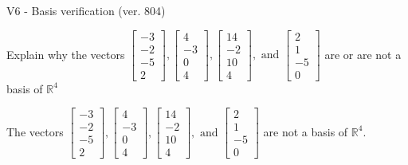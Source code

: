 \begin{exercise}
  \begin{exerciseTitle}V6 - Basis verification (ver. 804)\end{exerciseTitle}
  \begin{exerciseStatement}
    Explain why the vectors \(\left[\begin{array}{r}
-3 \\
-2 \\
-5 \\
2
\end{array}\right] , \left[\begin{array}{r}
4 \\
-3 \\
0 \\
4
\end{array}\right] , \left[\begin{array}{r}
14 \\
-2 \\
10 \\
4
\end{array}\right] , \text{ and } \left[\begin{array}{r}
2 \\
1 \\
-5 \\
0
\end{array}\right]\) are or are not a basis of \(\mathbb{R}^4\)	


  \end{exerciseStatement}
  \begin{exerciseAnswer}
   The vectors \(\left[\begin{array}{r}
-3 \\
-2 \\
-5 \\
2
\end{array}\right] , \left[\begin{array}{r}
4 \\
-3 \\
0 \\
4
\end{array}\right] , \left[\begin{array}{r}
14 \\
-2 \\
10 \\
4
\end{array}\right] , \text{ and } \left[\begin{array}{r}
2 \\
1 \\
-5 \\
0
\end{array}\right]\) 
  	 are not  a basis of \(\mathbb{R}^4\).
  


  \end{exerciseAnswer}
\end{exercise}